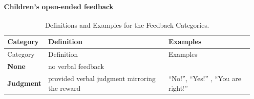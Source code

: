 \documentclass[floatsintext,man]{apa6}
\theoremstyle{definition}
\theoremstyle{definition}
\theoremstyle{definition}
\theoremstyle{remark}
\begin{document}
\paragraph{Children's open-ended
feedback}\label{childrens-open-ended-feedback}

\begin{longtable}[]{@{}lll@{}}
\caption{\label{tab:feedbackCat} Definitions and Examples for the Feedback
Categories.}\tabularnewline
\toprule
\begin{minipage}[b]{0.15\columnwidth}\raggedright\strut
Category\strut
\end{minipage} & \begin{minipage}[b]{0.45\columnwidth}\raggedright\strut
Definition\strut
\end{minipage} & \begin{minipage}[b]{0.31\columnwidth}\raggedright\strut
Examples\strut
\end{minipage}\tabularnewline
\midrule
\endfirsthead
\toprule
\begin{minipage}[b]{0.15\columnwidth}\raggedright\strut
Category\strut
\end{minipage} & \begin{minipage}[b]{0.45\columnwidth}\raggedright\strut
Definition\strut
\end{minipage} & \begin{minipage}[b]{0.31\columnwidth}\raggedright\strut
Examples\strut
\end{minipage}\tabularnewline
\midrule
\endhead
\begin{minipage}[t]{0.15\columnwidth}\raggedright\strut
\textbf{None}\strut
\end{minipage} & \begin{minipage}[t]{0.45\columnwidth}\raggedright\strut
no verbal feedback\strut
\end{minipage} & \begin{minipage}[t]{0.31\columnwidth}\raggedright\strut
\strut
\end{minipage}\tabularnewline
\begin{minipage}[t]{0.15\columnwidth}\raggedright\strut
\textbf{Judgment}\strut
\end{minipage} & \begin{minipage}[t]{0.45\columnwidth}\raggedright\strut
provided verbal judgment mirroring the reward\strut
\end{minipage} & \begin{minipage}[t]{0.31\columnwidth}\raggedright\strut
\enquote{No!}, \enquote{Yes!} , \enquote{You are right!}\strut

\end{minipage}
\end{longtable}
\end{document}
